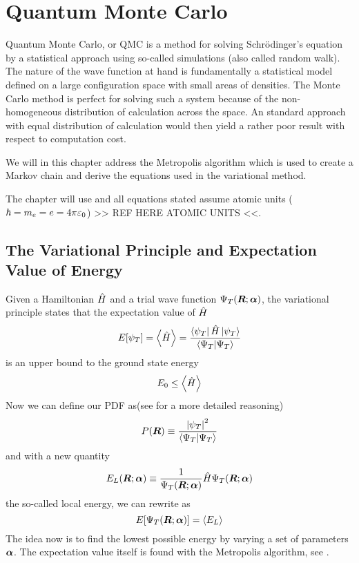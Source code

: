 \section{Quantum Monte Carlo\label{sec:QMC}}
    Quantum Monte Carlo, or QMC is a method for solving Schrödinger's equation
    by a statistical approach using so-called  simulations
    (also called random walk). The nature of the wave function at hand is
    fundamentally a statistical model defined on a large configuration space
    with small areas of densities. The Monte Carlo method is perfect for
    solving such a system because of the non-homogeneous distribution of
    calculation across the space. An standard approach with equal distribution
    of calculation would then yield a rather poor result with respect to
    computation cost.

    We will in this chapter address the Metropolis algorithm which is used to
    create a Markov chain and derive the equations used in the variational
    method.

    The chapter will use  \cite{GriffQuan} and all
    equations stated assume atomic units ($\hbar=m_e=e=4\pi\varepsilon_0$) >> REF
    HERE ATOMIC UNITS <<.

    \subsection{The Variational Principle and Expectation Value of Energy}
        Given a Hamiltonian $\hat{H}$ and a trial wave function ${\Psi}_T(\boldsymbol{{R}};\boldsymbol{{\alpha}})$, the
        variational principle \cite{GriffQuan, NeOr} states that the
        expectation value of $\hat{H}$
            \begin{equation}
                E[\psi_T] = \left< {\hat{H}} \right> =
                \frac{\bra{\psi_T}\hat{H}\ket{\psi_T}}{\bra{\Psi_T}\ket{\Psi_T}}
                \label{eq:ecpE}
            \end{equation}
        is an upper bound to the ground state energy
            \begin{equation}
                E_0 \leq \left< {\hat{H}} \right>
                \label{eq:ecpEBound}
            \end{equation}
        Now we can define our PDF as(see  for a more
        detailed reasoning)
            \begin{equation}
                P(\boldsymbol{{R}}) \equiv \frac{\abs{\psi_T}^2}{\bra{\Psi_T}\ket{\Psi_T}}
                \label{eq:PDFdef}
            \end{equation}
        and with a new quantity
            \begin{equation}
                E_L(\boldsymbol{{R}};\boldsymbol{{\alpha}}) \equiv \frac{1}{{\Psi}_T(\boldsymbol{{R}};\boldsymbol{{\alpha}})}\hat{H}{\Psi}_T(\boldsymbol{{R}};\boldsymbol{{\alpha}})
                \label{eq:ELdef}
            \end{equation}
        the so-called local energy, we can rewrite  as
            \begin{equation}
                E[{\Psi}_T(\boldsymbol{{R}};\boldsymbol{{\alpha}})] = \left< {E_L} \right>
            \end{equation}
        The idea now is to find the lowest possible energy by varying a set of
        parameters $\boldsymbol{{\alpha}}$. The expectation value itself is found with
        the Metropolis algorithm, see . \\

